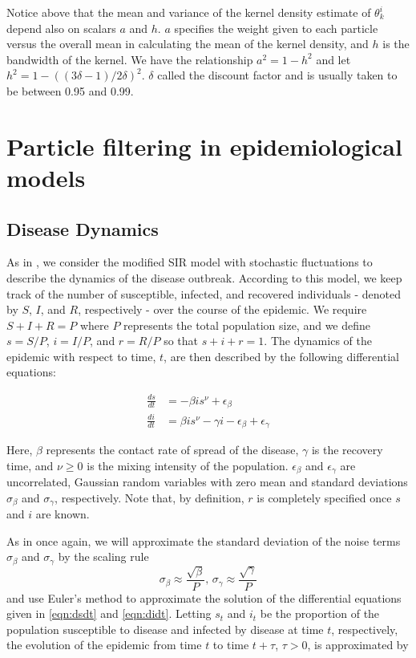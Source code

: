 \documentclass{article}
\begin{document}
Notice above that the mean and variance of the kernel density estimate of $\theta_k^i$ depend also on scalars $a$ and $h$.  $a$ specifies the weight given to each particle versus the overall mean in calculating the mean of the kernel density, and $h$ is the bandwidth of the kernel. We have the relationship $a^2 = 1 - h^2$ and let $h^2 = 1 - ((3\delta - 1)/2\delta)^2$.  $\delta$ called the discount factor and is usually taken to be between 0.95 and 0.99.


\section{Particle filtering in epidemiological models \label{sec:apply}}

\subsection{Disease Dynamics}

As in \citet{skvortsov2012monitoring}, we consider the modified SIR model with stochastic fluctuations to describe the dynamics of the disease outbreak.  According to this model, we keep track of the number of susceptible, infected, and recovered individuals - denoted by $S$, $I$, and $R$, respectively - over the course of the epidemic.  We require $S + I + R = P$ where $P$ represents the total population size, and we define $s = S/P$, $i = I/P$, and $r = R/P$ so that $s + i + r = 1$.  The dynamics of the epidemic with respect to time, $t$, are then described by the following differential equations:

\begin{align}
\frac{ds}{dt} &= -\beta is^\nu + \epsilon_\beta \label{eqn:dsdt} \\
\frac{di}{dt} &= \beta is^\nu - \gamma i - \epsilon_\beta + \epsilon_\gamma \label{eqn:didt}
\end{align}

\noindent Here, $\beta$ represents the contact rate of spread of the disease, $\gamma$ is the recovery time, and $\nu \ge 0$ is the mixing intensity of the population.  $\epsilon_\beta$ and $\epsilon_\gamma$ are uncorrelated, Gaussian random variables with zero mean and standard deviations $\sigma_\beta$ and $\sigma_\gamma$, respectively.  Note that, by definition, $r$ is completely specified once $s$ and $i$ are known.

As in \citet{skvortsov2012monitoring} once again, we will approximate the standard deviation of the noise terms $\sigma_\beta$ and $\sigma_\gamma$ by the scaling rule \[\sigma_\beta \approx \frac{\sqrt{\beta}}{P} \mbox{, } \sigma_\gamma \approx \frac{\sqrt{\gamma}}{P}\] and use Euler's method to approximate the solution of the differential equations given in \eqref{eqn:dsdt} and \eqref{eqn:didt}.  Letting $s_t$ and $i_t$ be the proportion of the population susceptible to disease and infected by disease at time $t$, respectively, the evolution of the epidemic from time $t$ to time $t + \tau$, $\tau > 0$, is approximated by
\end{document}
